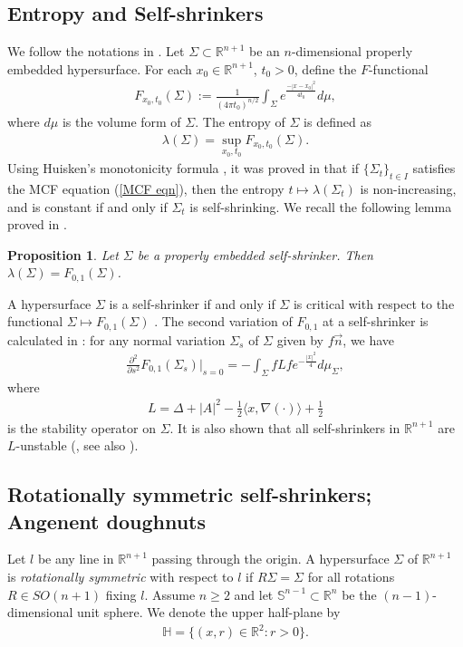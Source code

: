 \documentclass[12pt]{amsart}
\numberwithin{equation}{section}
\newtheorem{prop}[thm]{Proposition}
\theoremstyle{remark}
\begin{document}
	\subsection{Entropy and Self-shrinkers} We follow the notations in \cite{CM1}. Let $\Sigma \subset \mathbb R^{n+1}$ be an $n$-dimensional properly embedded hypersurface. For each $x_0\in \mathbb R^{n+1}$, $t_0>0$, define the $F$-functional 
	\begin{align*}
		F_{x_0, t_0} (\Sigma):= \frac{1}{(4\pi t_0)^{n/2}} \int_\Sigma e^{\frac{-|x-x_0|^2}{4t_0}} d\mu,
	\end{align*}
	where $d\mu$ is the volume form of $\Sigma$. The entropy of $\Sigma$ is defined as 
	\begin{align*}
		\lambda (\Sigma) = \sup_{x_0, t_0} F_{x_0, t_0} (\Sigma). 
	\end{align*}
	Using Huisken's monotonicity formula \cite{Huisken}, it was proved in \cite{CM1} that if $\{\Sigma_t\}_{t\in I}$ satisfies the MCF equation (\ref{MCF eqn}), then the entropy $t \mapsto \lambda (\Sigma_t)$ is non-increasing, and is constant if and only if $\Sigma_t$ is self-shrinking. We recall the following lemma proved in \cite[Section 7.2]{CM1}.
	
	\begin{prop} \label{equality between lambda and F_0,1}
		Let $\Sigma$ be a properly embedded self-shrinker. Then $\lambda(\Sigma) =F_{0,1} (\Sigma)$. 
	\end{prop}
	
	A hypersurface $\Sigma$ is a self-shrinker if and only if $\Sigma$ is critical with respect to the functional $\Sigma \mapsto F_{0,1} (\Sigma)$ \cite[Proposition 3.6]{CM1}. The second variation of $F_{0,1}$ at a self-shrinker is calculated in \cite[Section 4]{CM1}: for any normal variation $\Sigma_s$ of $\Sigma$ given by $f \vec n$, we have 
	\begin{align*}
		\frac{\partial^2 }{\partial s^2 } F_{0,1} (\Sigma_s) \bigg|_{s=0} = -\int_{\Sigma} f L f e^{-\frac{|x|^2}{4}} d\mu_\Sigma,
	\end{align*}
	where 
	\begin{align} \label{L operator definition}
		L = \Delta + |A|^2 -\frac 12 \langle x , \nabla (\cdot)\rangle + \frac 12
	\end{align}
	is the stability operator on $\Sigma$. It is also shown that all self-shrinkers in $\mathbb R^{n+1}$ are $L$-unstable (\cite{CM1}, see also \cite[Theorem 0.5]{CM2}). 
	
	\subsection{Rotationally symmetric self-shrinkers; Angenent doughnuts}
	Let $l$ be any line in $\mathbb{R}^{n+1}$ passing through the origin. A hypersurface $\Sigma$ of $\mathbb{R}^{n+1}$ is {\sl rotationally symmetric} with respect to $l$ if $R\Sigma = \Sigma$ for all rotations $R \in SO(n+1)$ fixing $l$.
	Assume $n\ge 2$ and let $\mathbb S^{n -1}\subset \mathbb R^n$ be the $(n-1)$-dimensional unit sphere. We denote the upper half-plane by
	\begin{align*}
		\mathbb H = \{ (x, r) \in \mathbb R^2 : r >0\}.
	\end{align*}
	
\end{document}

